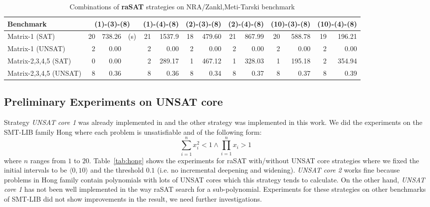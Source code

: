 \begin{table*}[t]
{\begin{tabular}{ | l | r | r  r | r | r  | r | r | r | r | r | r |r | r |}
\hline
\hline
    \multicolumn{1}{|l|}{Benchmark} & 
    \multicolumn{3}{c|}{(1)-(3)-(8)} & \multicolumn{2}{c|}{(1)-(4)-(8)} & 
    \multicolumn{2}{c|}{(2)-(3)-(8)} & \multicolumn{2}{c|}{(2)-(4)-(8)} & 
    \multicolumn{2}{c|}{(10)-(3)-(8)} & \multicolumn{2}{c|}{(10)-(4)-(8)} \\
\hline
 Matrix-1 (SAT) & 20 & 738.26 & (s) & 21 & 1537.9 & 18 & 479.60 & 21 & 867.99 & 20 & 588.78 & 19 & 196.21 
\\
\hline
 Matrix-1 (UNSAT) & 2 & 0.00 && 2 & 0.00 & 2 & 0.00 & 2 & 0.00 & 2 & 0.00 & 2 & 0.00 
\\
\hline
 Matrix-2,3,4,5 (SAT) & 0 & 0.00 && 2 & 289.17 & 1 & 467.12 & 1 & 328.03 & 1 & 195.18 & 2 & 354.94 
\\
\hline
 Matrix-2,3,4,5 (UNSAT) & 8 & 0.36 && 8 & 0.36 & 8 & 0.34 & 8 & 0.37 & 8 & 0.37 & 8 & 0.39 
\\
\hline
\end{tabular}
}
\bigskip
{}
\medskip
\caption{Combinations of {\bf raSAT} strategies on NRA/Zankl,Meti-Tarski benchmark} 
\label{tab:rasat-experiments}
\end{table*}

\subsection*{Preliminary Experiments on UNSAT core}
Strategy \emph{UNSAT core 1} was already implemented in \cite{VanKhanh201227} and the other strategy was implemented in this work. We did the experiments on the SMT-LIB family Hong where each problem is unsatisfiable and of the following form:
\[\sum_{i=1}^{n}x_i^2 < 1 \wedge \prod_{i=1}^{n}x_i > 1\]
where $n$ ranges from $1$ to $20$. Table~\ref{tab:hong} shows the experiments for raSAT with/without UNSAT core strategies where we fixed the initial intervals to be $\langle 0, 10 \rangle$ and the threshold $0.1$ (i.e. no incremental deepening and widening). \emph{UNSAT core 2} works fine because problems in Hong family contain polynomials with lots of UNSAT cores which this strategy tends to calculate. On the other hand, \emph{UNSAT core 1} has not been well implemented in the way raSAT search for a sub-polynomial. Experiments for these strategies on other benchmarks of SMT-LIB did not show improvements in the result, we need further investigations.

